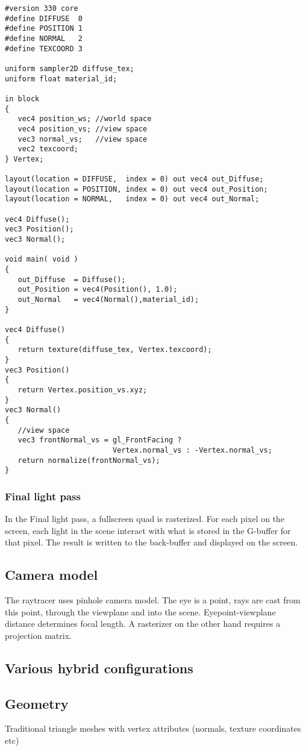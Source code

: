 \begin{Verbatim}[frame=single, label=G-buffer fragment shader]
#version 330 core
#define DIFFUSE  0
#define POSITION 1
#define NORMAL   2
#define TEXCOORD 3

uniform sampler2D diffuse_tex;
uniform float material_id;

in block
{
   vec4 position_ws; //world space
   vec4 position_vs; //view space
   vec3 normal_vs;   //view space
   vec2 texcoord;
} Vertex;

layout(location = DIFFUSE,  index = 0) out vec4 out_Diffuse;
layout(location = POSITION, index = 0) out vec4 out_Position;
layout(location = NORMAL,   index = 0) out vec4 out_Normal;

vec4 Diffuse();
vec3 Position();
vec3 Normal();

void main( void )
{
   out_Diffuse  = Diffuse();
   out_Position = vec4(Position(), 1.0);
   out_Normal   = vec4(Normal(),material_id);
}

vec4 Diffuse()
{
   return texture(diffuse_tex, Vertex.texcoord);
}
vec3 Position()
{
   return Vertex.position_vs.xyz;
}
vec3 Normal()
{
   //view space
   vec3 frontNormal_vs = gl_FrontFacing ? 
                         Vertex.normal_vs : -Vertex.normal_vs;
   return normalize(frontNormal_vs);
}
\end{Verbatim}

\subsubsection{Final light pass}
In the Final light pass, a fullscreen quad is rasterized. For each pixel on the screen, each light in the scene interact with what is stored in the G-buffer for that pixel. The result is written to the back-buffer and displayed on the screen.

\subsection{Camera model}
The raytracer uses pinhole camera model. The eye is a point, rays are cast from this point, through the viewplane and into the scene. Eyepoint-viewplane distance determines focal length. A rasterizer on the other hand requires a projection matrix.

\subsection{Various hybrid configurations}

\subsection{Geometry}
Traditional triangle meshes with vertex attributes (normals, texture coordinates etc)

